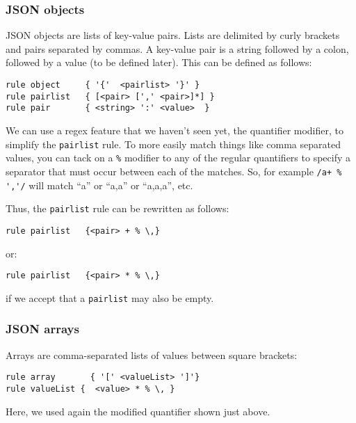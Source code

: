 \subsubsection{JSON objects}

JSON objects are lists of key-value pairs. Lists are 
delimited by curly brackets and pairs separated by 
commas. A key-value pair is a string followed by a colon, 
followed by a value (to be defined later). This can be 
defined as follows:

\begin{verbatim}
rule object     { '{'  <pairlist> '}' }
rule pairlist   { [<pair> [',' <pair>]*] }
rule pair       { <string> ':' <value>  }
\end{verbatim}

We can use a regex feature that we haven't seen yet, the 
quantifier modifier, to simplify the {\tt pairlist} 
rule. To more easily match things like comma separated 
values, you can tack on a \verb'%' modifier to any of the regular quantifiers to specify a separator that must occur between each of the matches. So, for example \verb"/a+ % ','/" will match ``a'' or 
``a,a'' or ``a,a,a'', etc.

Thus, the {\tt pairlist} rule can be rewritten as follows:

\begin{verbatim}
rule pairlist   {<pair> + % \,}
\end{verbatim}

or:

\begin{verbatim}
rule pairlist   {<pair> * % \,}
\end{verbatim}

if we accept that a {\tt pairlist} may also be empty.

\subsubsection{JSON arrays}

Arrays are comma-separated lists of values between square 
brackets:

\begin{verbatim}
rule array       { '[' <valueList> ']'}
rule valueList {  <value> * % \, }
\end{verbatim}

Here, we used again the modified quantifier shown 
just above.

